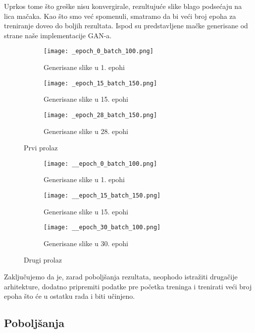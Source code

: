\documentclass[a4paper]{article}
\begin{document}
Uprkos tome što greške nisu konvergirale, rezultujuće slike blago podsećaju na lica mačaka. Kao što smo već spomenuli, smatramo da bi veći broj epoha za treniranje doveo do boljih rezultata. Ispod su predstavljene mačke generisane od strane naše implementacije GAN-a. 

\begin{figure}[h!]
    \centering
    \begin{subfigure}{0.3\linewidth}
     \texttt{[image: \_epoch\_0\_batch\_100.png]}
     \caption{Generisane slike u 1. epohi}
     \end{subfigure}
     \begin{subfigure}{0.3\linewidth}
     \texttt{[image: \_epoch\_15\_batch\_150.png]}
     \caption{Generisane slike u 15. epohi}
     \end{subfigure}
     \begin{subfigure}{0.3\linewidth}
     \texttt{[image: \_epoch\_28\_batch\_150.png]}
     \caption{Generisane slike u 28. epohi}
     \end{subfigure}
    \label{fig:cats_first_run}
    \caption{Prvi prolaz}
\end{figure}

\begin{figure}[h!]
    \centering
    \begin{subfigure}{0.3\linewidth}
     \texttt{[image: \_\_epoch\_0\_batch\_100.png]}
     \caption{Generisane slike u 1. epohi}
     \end{subfigure}
     \begin{subfigure}{0.3\linewidth}
     \texttt{[image: \_\_epoch\_15\_batch\_150.png]}
     \caption{Generisane slike u 15. epohi}
     \end{subfigure}
     \begin{subfigure}{0.3\linewidth}
     \texttt{[image: \_\_epoch\_30\_batch\_100.png]}
     \caption{Generisane slike u 30. epohi}
     \end{subfigure}
    \label{fig:cats_second_run}
    \caption{Drugi prolaz}
\end{figure}

Zaključujemo da je, zarad poboljšanja rezultata, neophodo istražiti drugačije arhitekture, dodatno pripremiti podatke pre početka treninga i trenirati veći broj epoha što će u ostatku rada i biti učinjeno.

\subsection{Poboljšanja}


  
\renewcommand{\refname}{Literatura}
\newpage

\end{document}
